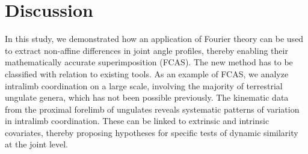 \documentclass[10pt, a4paper]{article}
\begin{document}
\section*{Discussion}
\begin{linenumbers}[1]
In this study, we demonstrated how an application of Fourier theory can be used to extract non-affine differences in joint angle profiles, thereby enabling their mathematically accurate superimposition (FCAS). 
The new method has to be classified with relation to existing tools. 
As an example of FCAS, we analyze intralimb coordination on a large scale, involving the majority of terrestrial ungulate genera, which has not been possible previously.  
The kinematic data from the proximal forelimb of ungulates reveals systematic patterns of variation in intralimb coordination. 
These can be linked to extrinsic and intrinsic covariates, thereby proposing hypotheses for specific tests of dynamic similarity at the joint level. 



\end{linenumbers}
\end{document}
